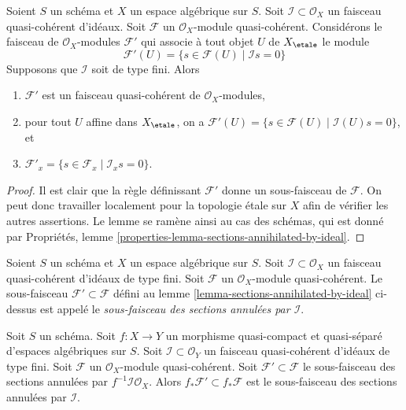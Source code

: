 \begin{lemma}
\label{lemma-sections-annihilated-by-ideal}
Soient $S$ un schéma et $X$ un espace algébrique sur $S$.
Soit $\mathcal{I} \subset \mathcal{O}_X$ un faisceau quasi-cohérent d'idéaux.
Soit $\mathcal{F}$ un $\mathcal{O}_X$-module quasi-cohérent.
Considérons le faisceau de $\mathcal{O}_X$-modules $\mathcal{F}'$
qui associe à tout objet $U$ de $X_\etale$ le module
$$
\mathcal{F}'(U)
=
\{s \in \mathcal{F}(U) \mid
\mathcal{I}s = 0\}
$$
Supposons que $\mathcal{I}$ soit de type fini. Alors
\begin{enumerate}
\item $\mathcal{F}'$ est un faisceau quasi-cohérent de $\mathcal{O}_X$-modules,
\item pour tout $U$ affine dans $X_\etale$, on a
$\mathcal{F}'(U) = \{s \in \mathcal{F}(U) \mid \mathcal{I}(U)s = 0\}$, et
\item $\mathcal{F}'_x = \{s \in \mathcal{F}_x \mid \mathcal{I}_x s = 0\}$.
\end{enumerate}
\end{lemma}

\begin{proof}
Il est clair que la règle définissant $\mathcal{F}'$ donne un sous-faisceau
de $\mathcal{F}$. On peut donc travailler localement pour la topologie étale sur $X$
afin de vérifier les autres assertions. Le lemme se ramène ainsi au cas des schémas,
qui est donné par
Propriétés, lemme \ref{properties-lemma-sections-annihilated-by-ideal}.
\end{proof}

\begin{definition}
\label{definition-subsheaf-sections-annihilated-by-ideal}
Soient $S$ un schéma et $X$ un espace algébrique sur $S$.
Soit $\mathcal{I} \subset \mathcal{O}_X$ un faisceau quasi-cohérent
d'idéaux de type fini.
Soit $\mathcal{F}$ un $\mathcal{O}_X$-module quasi-cohérent.
Le sous-faisceau $\mathcal{F}' \subset \mathcal{F}$ défini au
lemme \ref{lemma-sections-annihilated-by-ideal} ci-dessus est appelé
le {\it sous-faisceau des sections annulées par $\mathcal{I}$}.
\end{definition}

\begin{lemma}
\label{lemma-push-sections-annihilated-by-ideal}
Soit $S$ un schéma.
Soit $f : X \to Y$ un morphisme quasi-compact et quasi-séparé
d'espaces algébriques sur $S$.
Soit $\mathcal{I} \subset \mathcal{O}_Y$ un faisceau quasi-cohérent
d'idéaux de type fini. Soit $\mathcal{F}$ un
$\mathcal{O}_X$-module quasi-cohérent. Soit $\mathcal{F}' \subset \mathcal{F}$
le sous-faisceau des sections annulées par $f^{-1}\mathcal{I}\mathcal{O}_X$.
Alors $f_*\mathcal{F}' \subset f_*\mathcal{F}$ est le sous-faisceau
des sections annulées par $\mathcal{I}$.
\end{lemma}

